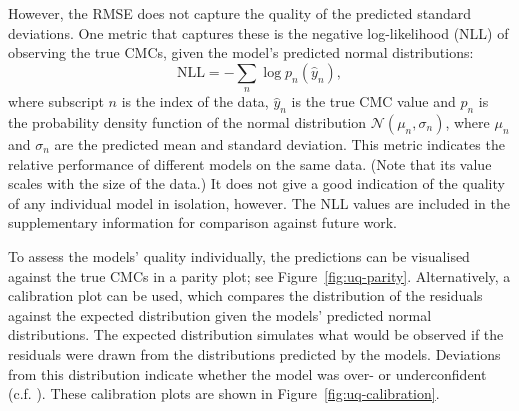 However, the RMSE does not capture the quality of the predicted standard deviations. One metric that captures these is the negative log-likelihood (NLL) of observing the true CMCs, given the model's predicted normal distributions:
\begin{equation}
    \text{NLL} = -\sum_n \log p_n(\hat{y}_n),
\end{equation}
where subscript $n$ is the index of the data, $\hat{y}_n$ is the true CMC value and $p_n$ is the probability density function of the normal distribution $\mathcal{N}(\mu_n, \sigma_n)$, where $\mu_n$ and $\sigma_n$ are the predicted
mean and standard deviation. This metric indicates the relative performance of different models on the same data. (Note that its value scales with the size of the data.) It does not give a good indication of the quality of any individual
model in isolation, however. The NLL values are included in the supplementary information for comparison against future work.

To assess the models' quality individually, the predictions can be visualised against the true CMCs in a parity plot; see Figure~\ref{fig:uq-parity}. Alternatively, a calibration plot can be used, which compares the distribution of the residuals against the expected distribution given the models' predicted normal distributions. The expected distribution simulates what would be observed if the residuals were drawn from the distributions predicted by the models.
Deviations from this distribution indicate whether the model was over- or underconfident (c.f. \citet{tranMethodsComparingUncertainty2020}). These calibration plots are shown in Figure~\ref{fig:uq-calibration}.

